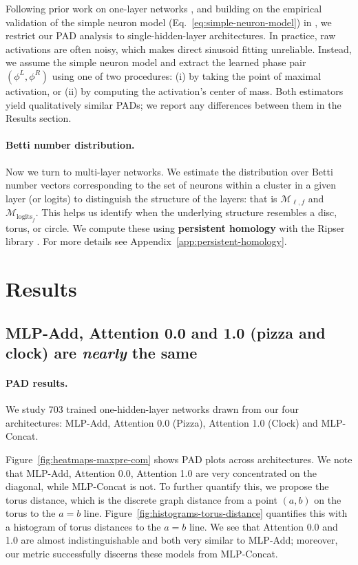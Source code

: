 \documentclass{article} %
\theoremstyle{plain}
\theoremstyle{definition}
\newtheorem{empirical fact}[theorem]{Empirical Fact}
\begin{document}
Following prior work on one-layer networks \citep{nanda2023progress, zhong2023the}, and building on the empirical validation of the simple neuron model (Eq.~\ref{eq:simple-neuron-model}) in \citet{mccracken2025uncoveringuniversalabstractalgorithm}, we restrict our PAD analysis to single-hidden-layer architectures. In practice, raw activations are often noisy, which makes direct sinusoid fitting unreliable. Instead, we assume the simple neuron model and extract the learned phase pair $(\phi^L, \phi^R)$ using one of two procedures: (i) by taking the point of maximal activation, or (ii) by computing the activation’s center of mass. Both estimators yield qualitatively similar PADs; we report any differences between them in the Results section.


\paragraph{\textbf{Betti number distribution.}} Now we turn to multi-layer networks. We estimate the distribution over Betti number vectors corresponding to the set of neurons within a cluster in a given layer (or logits) to distinguish the structure of the layers: that is $\mathcal{M}_{\ell,f}$ and $\mathcal{M}_{\text{logits}_f}$. This helps us identify when the underlying structure resembles a disc, torus, or circle. We compute these using \textbf{persistent homology} with the Ripser library \citep{Bauer2021Ripser, de_Silva_2011, ctralie2018ripser}. For more details see Appendix~\ref{app:persistent-homology}. 


\section{Results}\label{sec:results}


\subsection{MLP-Add, Attention 0.0 and 1.0 (pizza and clock) are \emph{nearly} the same}

\paragraph{\textbf{PAD results.}} We study 703 trained one-hidden-layer networks drawn from our four architectures: MLP-Add, Attention 0.0 (Pizza), Attention 1.0 (Clock) and MLP-Concat. 

Figure~\ref{fig:heatmaps-maxpre-com} shows PAD plots across architectures. We note that MLP-Add, Attention 0.0, Attention 1.0 are very concentrated on the diagonal, while MLP-Concat is not. To further quantify this, we propose the torus distance, which is the discrete graph distance from a point $(a,b)$ on the torus to the $a=b$ line. Figure~\ref{fig:histograms-torus-distance} quantifies this with a histogram of torus distances to the $a=b$ line. We see that Attention 0.0 and 1.0 are almost indistinguishable and both very similar to MLP-Add; moreover, our metric successfully discerns these models from MLP-Concat.
\end{document}
